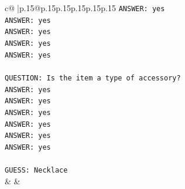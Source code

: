 \documentclass{article}
\begin{document}
{\begin{supertabular}{c@{$\;$}|p{.15\linewidth}@{}p{.15\linewidth}p{.15\linewidth}p{.15\linewidth}p{.15\linewidth}p{.15\linewidth}}
{{{\texttt{ANSWER: yes  } \\
\texttt{ANSWER: yes  } \\
\texttt{ANSWER: yes  } \\
\texttt{ANSWER: yes  } \\
\texttt{ANSWER: yes  } \\
\\ 
\texttt{QUESTION: Is the item a type of accessory?  } \\
\texttt{ANSWER: yes  } \\
\texttt{ANSWER: yes  } \\
\texttt{ANSWER: yes  } \\
\texttt{ANSWER: yes  } \\
\texttt{ANSWER: yes  } \\
\texttt{ANSWER: yes  } \\
\\ 
\texttt{GUESS: Necklace} \\
            }
        }
    }
    & & \\ \\


\end{supertabular}}
\end{document}
